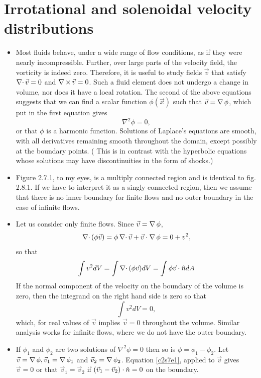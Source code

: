 \section{Irrotational and solenoidal velocity distributions}\label{c2s7}
\begin{itemize}
\item Most fluids behave, under a wide range of flow conditions, as if they were nearly incompressible. Further, over large parts of the velocity field, the vorticity is indeed zero.
Therefore, it is useful to study fields $\vec{v}$ that satisfy $\operatorname{\nabla\cdot}{\vec{v}} = 0$ and $\operatorname{\nabla\operatorname{\times}}{\vec{v}} = 0$. Such a fluid element does not undergo a change in volume, nor does it have
a local rotation. The second of the above equations suggests that we can find a scalar function $\phi(\vec{x})$ such that $\vec{v} = \operatorname{\nabla}{\phi}$, which put in the first equation gives
\[
\nabla^2\phi = 0,
\]
or that $\phi$ is a harmonic function. Solutions of Laplace's equations are smooth, with all derivatives remaining smooth throughout the domain, except possibly at the boundary points. (
This is in contrast with the hyperbolic equations whose solutions may have discontinuities in the form of shocks.)

\item Figure 2.7.1, to my eyes, is a multiply connected region and is identical to fig. 2.8.1. If we have to interpret it as a singly connected region, then we assume that there is no
inner boundary for finite flows and no outer boundary in the case of infinite flows.

\item Let us consider only finite flows. Since $\vec{v} = \operatorname{\nabla}{\phi}$,
\[
\operatorname{\nabla\cdot}{(\phi\vec{v})} = \phi\operatorname{\nabla\cdot}{\vec{v}} + \vec{v}\cdot\operatorname{\nabla}{\phi} = 0 + v^2,
\]
so that
\[
\int v^2 dV = \int\operatorname{\nabla\cdot}{(\phi\vec{v})}dV = \int \phi\vec{v}\cdot\hat{n} dA
\]
If the normal component of the velocity on the boundary of the volume is zero, then the integrand on the right hand side is zero so that 
\begin{equation}\label{c2s7e1}
\int v^2 dV = 0,
\end{equation}
which, for real values of $\vec{v}$ implies $\vec{v} = 0$ throughout the volume. Similar analysis works for infinite flows, where we do not have the outer boundary.

\item If $\phi_1$ and $\phi_2$ are two solutions of $\nabla^2\phi = 0$ then so is $\phi = \phi_1 - \phi_2$. Let $\vec{v} = \operatorname{\nabla}{\phi}, \vec{v}_1 = \operatorname{\nabla}{\phi}_1$ and 
$\vec{v}_2 = \operatorname{\nabla}{\phi}_2$. Equation \eqref{c2s7e1}, applied to $\vec{v}$ gives $\vec{v} = 0$ or that $\vec{v}_1 = \vec{v}_2$ if $(\vec{v}_1 - \vec{v}_2)\cdot\hat{n} = 0$ on the boundary.


\end{itemize}
